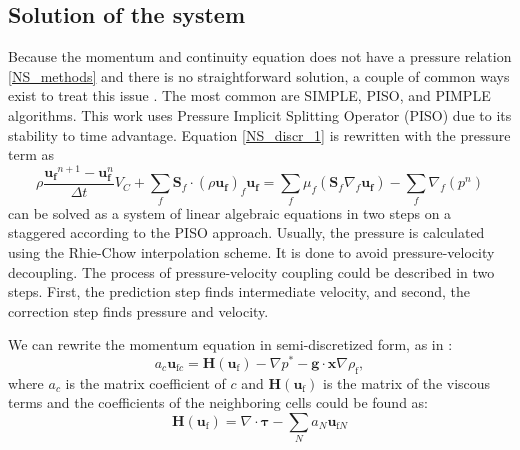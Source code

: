 \subsection{Solution of the system}\label{p-v-coupling}
Because the momentum and continuity equation does not have a pressure relation \ref{NS_methods} and there is no straightforward solution, a couple of common ways exist to treat this issue \cite{ferziger2002cfd}. The most common are SIMPLE, PISO, and PIMPLE algorithms. This work uses Pressure Implicit Splitting Operator (PISO) \cite{ferziger2002cfd} due to its stability to time advantage. Equation \ref{NS_discr_1} is rewritten with the pressure term as
\begin{equation} \label{NS_algebraic}
\rho \frac{\mathbf{u}_{\mathbf{f}}{ }^{n+1}-\mathbf{u}_{\mathbf{f}}^{n}}{\Delta t} V_C+\sum_f \mathbf{S}_f \cdot\left(\rho \mathbf{u}_{\mathbf{f}}\right)_f \mathbf{u}_{\mathbf{f}}=\sum_f \mu_f\left(\mathbf{S}_f \nabla_f \mathbf{u}_{\mathbf{f}}\right)-\sum_f \nabla_f\left(p^n\right)
\end{equation}
can be solved as a system of linear algebraic equations in two steps on a staggered according to the PISO approach. Usually, the pressure is calculated using the Rhie-Chow\cite{rhie} interpolation scheme. It is done to avoid pressure-velocity decoupling. The process of pressure-velocity coupling could be described in two steps. First, the prediction step finds intermediate velocity, and second, the correction step finds pressure and velocity.

We can rewrite the momentum equation in semi-discretized form, as in \cite{issa1986solution}:
\begin{equation}
  a_c \boldsymbol{u}_{\mathrm{f} c}=\mathbf{H}\left(\boldsymbol{u}_{\mathrm{f}}\right)-\nabla p^*-\boldsymbol{g} \cdot \boldsymbol{x} \nabla \rho_{\mathrm{f}},  
\end{equation}
where $a_c$ is the matrix coefficient of $c$ and $\mathbf{H}\left(\boldsymbol{u}_{\mathrm{f}}\right)$ is the matrix of the viscous terms and the coefficients of the neighboring cells could be found as:
\begin{equation}
\mathbf{H}\left(\boldsymbol{u}_{\mathrm{f}}\right)=\nabla \cdot \boldsymbol{\tau}-\sum_N a_N \boldsymbol{u}_{\mathrm{f} N}
\end{equation}

